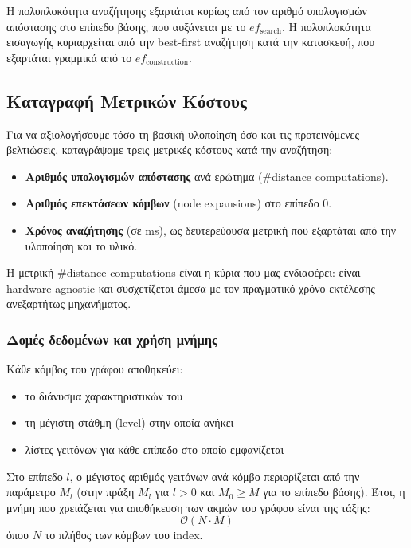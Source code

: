 \documentclass[12pt,a4paper]{article}
\begin{document}
Η πολυπλοκότητα αναζήτησης εξαρτάται κυρίως από τον αριθμό υπολογισμών απόστασης στο επίπεδο βάσης, που αυξάνεται με το $ef_{\text{search}}$. Η πολυπλοκότητα εισαγωγής κυριαρχείται από την best-first αναζήτηση κατά την κατασκευή, που εξαρτάται γραμμικά από το $ef_{\text{construction}}$.

\subsection{Καταγραφή Μετρικών Κόστους}
Για να αξιολογήσουμε τόσο τη βασική υλοποίηση όσο και τις προτεινόμενες βελτιώσεις, καταγράψαμε τρεις μετρικές κόστους κατά την αναζήτηση:
\begin{itemize}
    \item \textbf{Αριθμός υπολογισμών απόστασης} ανά ερώτημα (\#distance computations).
    \item \textbf{Αριθμός επεκτάσεων κόμβων} (node expansions) στο επίπεδο 0.
    \item \textbf{Χρόνος αναζήτησης} (σε ms), ως δευτερεύουσα μετρική που εξαρτάται από την υλοποίηση και το υλικό.
\end{itemize}
Η μετρική \#distance computations είναι η κύρια που μας ενδιαφέρει: είναι hardware-agnostic και συσχετίζεται άμεσα με τον πραγματικό χρόνο εκτέλεσης ανεξαρτήτως μηχανήματος.

\subsubsection{Δομές δεδομένων και χρήση μνήμης}
Κάθε κόμβος του γράφου αποθηκεύει:
\begin{itemize}
    \item το διάνυσμα χαρακτηριστικών του
    \item τη μέγιστη στάθμη (level) στην οποία ανήκει
    \item λίστες γειτόνων για κάθε επίπεδο στο οποίο εμφανίζεται
\end{itemize}

Στο επίπεδο $l$, ο μέγιστος αριθμός γειτόνων ανά κόμβο περιορίζεται από την παράμετρο $M_l$ (στην πράξη $M_l$ για $l>0$ και $M_0 \ge M$ για το επίπεδο βάσης). Έτσι, η μνήμη που χρειάζεται για αποθήκευση των ακμών του γράφου είναι της τάξης:
\begin{equation}
    \mathcal{O}(N\cdot M)
\end{equation}
όπου $Ν$ το πλήθος των κόμβων του index.
\end{document}
